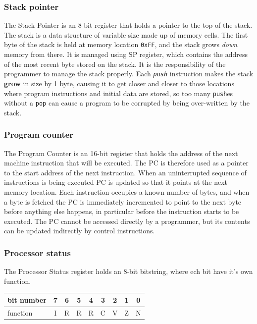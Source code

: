 \documentclass{ol-softwaremanual}
\begin{document}
    \subsubsection{Stack pointer}
    The Stack Pointer is an 8-bit register that holds a pointer to the top of the stack.\\
    The stack is a data structure of variable size made up of memory cells. The first byte of the stack is held at memory location {\tt{0xFF}}, and the stack grows {\em{down}} memory from there. It is managed using SP register, which contains the address of the most recent byte stored on the stack. It is the responsibility of the programmer to manage the stack properly. Each {\tt{\em{push}}} instruction makes the stack {\bf{grow}} in size by 1 byte, causing it to get closer and closer to those locations where program instructions and initial data are stored, so too many {\tt{push}}es without a {\tt{pop}} can cause a program to be corrupted by being over-written by the stack.

    \subsubsection{Program counter}
    The Program Counter is an 16-bit register that holds the address of the next machine instruction that will
    be executed.
    The PC is therefore used as a pointer to the start address of the next instruction. When an
    uninterrupted sequence of instructions is being executed PC is updated so that
    it points at the next memory location. Each instruction occupies a known number of bytes, and when a
    byte is fetched the PC is immediately incremented to point to the next byte before anything else happens, in
    particular before the instruction starts to be executed. The PC cannot be accessed directly by a programmer,
    but its contents can be updated indirectly by control instructions.

    \subsubsection{Processor status}
    The Processor Status register holds an 8-bit bitstring, where ech bit have it's own function.


    \begin{tabular}{l || c | c | c | c | c | c | c | c }
        bit number & 7 & 6 & 5 & 4 & 3 & 2 & 1 & 0 \\ \hline
        function   & I & R & R & R & C & V & Z & N
    \end{tabular}
\end{document}

